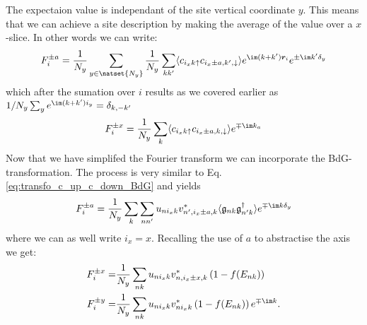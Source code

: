 \documentclass[../main.tex]{subfile}
\begin{document}
The expectaion value is independant of the site vertical coordinate $y$. This means that we can achieve a site description by making the average of the value over a $x$-slice. In other words
we can write:
\begin{equation*}
    F^{\pm a}_i = 
    \frac{1}{N_y}\sum_{y\in\natset{N_y}} \frac{1}{N_y} \sum_{kk'} \langle c_{i_x k\uparrow} c_{i_x \pm a,k',\downarrow} \rangle e^{\im(k + k')\bm{r}_i} e^{\pm\im k'\delta_y}
\end{equation*}
which after the sumation over $i$ results as we covered earlier as $1/N_y \sum_{y} e^{\im(k + k')i_y} = \delta_{k,-k'}$
\begin{equation*}
    F^{\pm x}_i = 
    \frac{1}{N_y} \sum_{k} \langle c_{i_x k\uparrow} c_{i_x\pm a,k,\downarrow} \rangle e^{\mp\im k_a}
\end{equation*}
Now that we have simplifed the Fourier transform we can incorporate the BdG-transformation. The process is very similar to Eq.\ref{eq:transfo_c_up_c_down_BdG} and yields
\begin{equation}\label{eq:transfo_F_x}
    F^{\pm a}_i =\frac{1}{N_y}\sum_{k}\sum_{nn'} u_{ni_x k}v_{n',i_x \pm a,k}^{\ast} \langle \mathfrak{g}_{nk} \mathfrak{g}_{n'k}^{\dagger} \rangle e^{\mp\im k \delta_y}
\end{equation}
where we can as well write $i_x = x$. Recalling the use of $a$ to abstractise the axis we get:
\begin{align}
    F^{\pm x}_i =& \frac{1}{N_y} \sum_{nk} u_{ni_x k} v_{n,i_x\pm x,k}^{\ast}\left(1 - f(E_{nk})\right)\\
    F^{\pm y}_i =& \frac{1}{N_y} \sum_{nk} u_{ni_x k} v_{n i_x k}^{\ast}\left(1 - f(E_{nk})\right) e^{\mp \im k}.
\end{align}
\end{document}
